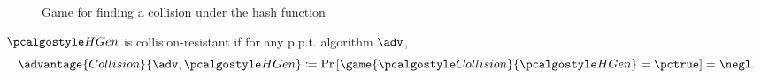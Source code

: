\begin{figure}[tbhp]
  \begin{center}
    \begin{tcolorbox}[width=8cm]
      \begin{pchstack}[center]
      \end{pchstack}
    \end{tcolorbox}
  \end{center}
  \caption{Game for finding a collision under the hash function \label{fig:break-hash-collision}}
\end{figure}

\begin{definition}
  $\algo{HGen}$ is collision-resistant if for any p.p.t. algorithm $\adv$,
 \[
  \advantage{Collision}{\adv, \algo{HGen}} \defeq \pr{\game{\algo{Collision}}{\algo{HGen}} = \pctrue} = \negl.
 \]
\end{definition}

